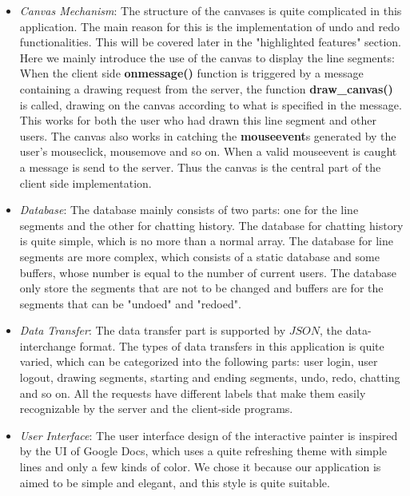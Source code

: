 \documentclass[a4paper,11pt,3p]{article}
\begin{document}
\begin{itemize}
\item
\emph{Canvas Mechanism}: The structure of the canvases is quite complicated in this application. 
The main reason for this is the implementation of undo and redo functionalities. This will be 
covered later in the "highlighted features" section. Here we mainly introduce the use of the 
canvas to display the line segments: When the client side \textbf{onmessage()} function is triggered by a 
message containing a drawing request from the server, the function \textbf{draw\_canvas()} is called, 
drawing on the canvas according to what is specified in the message. This works for both the user 
who had drawn this line segment and other users. The canvas also works in catching the 
\textbf{mouseevent}s generated by the user's mouseclick, mousemove and so on. When a valid mouseevent 
is caught a message is send to the server. Thus the canvas is the central part of the client side 
implementation.\\

\item
\emph{Database}: The database mainly consists of two parts: one for the line segments and the other 
for chatting history. The database for chatting history is quite simple, which is no more than a 
normal array. The database for line segments are more complex, which consists of a static database 
and some buffers, whose number is equal to the number of current users. The database only store the 
segments that are not to be changed and buffers are for the segments that can be "undoed" and "redoed".\\

\item
\emph{Data Transfer}: The data transfer part is supported by $JSON$, the data-interchange format. 
The types of data transfers in this application is quite varied, which can be categorized into the 
following parts: user login, user logout, drawing segments, starting and ending segments, undo, redo, 
chatting and so on. All the requests have different labels that make them easily recognizable by the 
server and the client-side programs.\\

\item
\emph{User Interface}: The user interface design of the interactive painter is inspired by the 
UI of Google Docs, which uses a quite refreshing theme with simple lines and only a few kinds of 
color. We chose it because our application is aimed to be simple and elegant, and this style is 
quite suitable.\\

\end{itemize}
\end{document}
